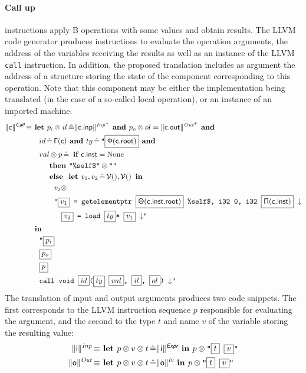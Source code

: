 \documentclass{llncs}
\newcommand{\trad}[2]{\ensuremath{\lVert \textsf{#1} \rVert^{\textit{#2}}}}
\newcommand{\nl}[0]{\ensuremath{\downarrow}}
\DeclareMathOperator{\isdef}{\equiv}
\DeclareMathOperator{\variable}{\mathcal{V}()}
\newcommand{\llvm}[1]{\texttt{#1}}
\newcommand{\B}[1]{\textsf{#1}}
\newcommand{\ListOf}[1]{$\mbox{#1}^+$}
\newcommand{\IF}[0]{\textbf{ if }}
\newcommand{\ELSE}[0]{\textbf{ else }}
\newcommand{\THEN}[0]{\textbf{ then }}
\newcommand{\LET}[0]{\textbf{ let }}
\DeclareMathOperator{\BE}{\hat{=}}
\newcommand{\IN}[0]{\textbf{ in }}
\newcommand{\AND}[0]{\textbf{ and }}
\newcommand{\PH}[1]{\framebox{$#1$}}
\newcommand{\sep}[0]{\otimes}
\newcommand{\Global}[0]{\ensuremath{\sf\Gamma}}
\newcommand{\idx}[0]{\ensuremath{\sf\Pi}}
\newcommand{\state}[0]{\ensuremath{\sf\Theta}}
\newcommand{\stateref}[0]{\ensuremath{\sf\Phi}}
\newcommand{\self}[0]{\llvm{\%self\$}}
\begin{document}
\paragraph{Call up} instructions apply B operations with some values and obtain
results. The LLVM code generator produces instructions to evaluate the operation
arguments, the address of the variables receiving the results as well as an
instance of the LLVM \llvm{call} instruction. In addition, the proposed
translation includes as argument the address of a structure storing the state of
the component corresponding to this operation. Note that this component may be
either the implementation being translated (in the case of a so-called local
operation), or an instance of an imported machine.
\begin{align*}
  \trad{c}{\B{Call}} \isdef
  & \LET p_i \sep il \BE \trad{c.inp}{\ListOf{Inp}} \AND p_o \sep ol =
  \trad{c.out}{\ListOf{Out}} \AND \\
  & \quad id \BE {\Global(\B{c})} \AND ty \BE \llvm{"\PH{\stateref(\B{c.root})}} \AND \\
  & \quad val \sep p \BE \IF \B{c.inst} = \text{None} \\
  & \quad \quad \THEN \llvm{"\self"} \sep \llvm{""} \\
  & \quad \quad \ELSE \LET v_1, v_2 \BE \variable, \variable \IN \\
  & \quad \quad \quad v_2 \sep \\
  & \quad \quad \quad \llvm{"\PH{v_1} = getelementptr \PH{ \state({\B{c.inst.root}})} \self, i32 0, i32 \PH{\idx(\B{c.inst})} \nl} \\
  & \quad \quad \quad \quad \llvm{\PH{v_2} = load \PH{ty}* \PH{v_1} \nl"} \\
  & \IN \\
  & \quad \llvm{"\PH{p_i}} \\
  & \quad \llvm{\PH{p_o}} \\
  & \quad \llvm{\PH{p}} \\
  & \quad \llvm{call void \PH{id}(\PH{ty} \PH{val}, \PH{il}, \PH{ol}) \nl"}
\end{align*}
The translation of input and output arguments produces two code snippets. The
first corresponds to the LLVM instruction sequence $p$ responsible for
evaluating the argument, and the second to the type $t$ and name $v$ of the
variable storing the resulting value:
\begin{align*}
  \trad{i}{Inp} \isdef
  & \LET p \sep v \sep t \BE \trad{i}{\B{Expr}} \IN p \sep \llvm{"\PH{t} \PH{v}"}\\
  \trad{o}{Out} \isdef
  & \LET p \sep v \sep t \BE \trad{o}{lv} \IN p \sep \llvm{"\PH{t} \PH{v}"}
\end{align*}
\end{document}
